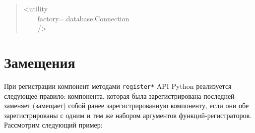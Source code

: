 \documentclass[a4paper,openany,twoside,final]{book}
\begin{document}
\begin{quote}{\ttfamily \raggedright \noindent
<utility\\
~~~~factory=\textquotedbl{}.database.Connection\textquotedbl{}\\
~~~~/>
}
\end{quote}


\section{Замещения%
  \label{id48}%
}

При регистрации компонент методами \texttt{register*} API Python
реализуется следующее правило: компонента, которая была
зарегистрирована последней заменяет (замещает) собой ранее зарегистрированную
компоненту, если они обе зарегистрированы с одним и тем же набором
аргументов функций-регистраторов.  Рассмотрим следующий пример:
\end{document}
